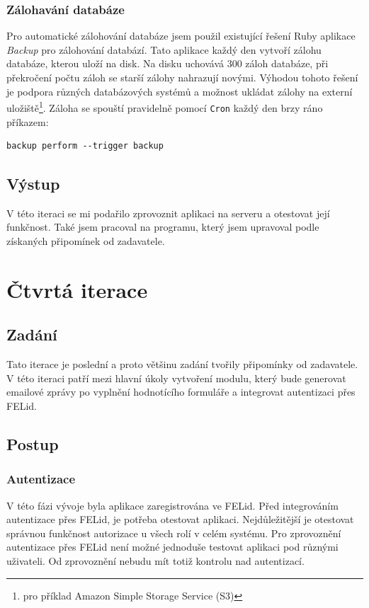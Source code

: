 \subsubsection{Zálohavání databáze}
Pro automatické zálohování databáze jsem použil existující řešení Ruby aplikace \textit{Backup} pro zálohování databází. Tato aplikace každý den vytvoří zálohu databáze, kterou uloží na disk. Na disku uchovává 300 záloh databáze, při překročení počtu záloh se starší zálohy nahrazují novými. Výhodou tohoto řešení je podpora různých databázových systémů a možnost ukládat zálohy na externí uložiště\footnote{pro příklad Amazon Simple Storage Service (S3)}. Záloha se spouští pravidelně pomocí \verb|Cron| každý den brzy ráno příkazem:
\begin{verbatim}
backup perform --trigger backup
\end{verbatim} 

\subsection{Výstup} 
V této iteraci se mi podařilo zprovoznit aplikaci na serveru a otestovat její funkčnost. Také jsem pracoval na programu, který jsem upravoval podle získaných připomínek od zadavatele.

\section{Čtvrtá iterace}
\subsection{Zadání}
Tato iterace je poslední a proto většinu zadání tvořily připomínky od zadavatele. V této iteraci patří mezi hlavní úkoly vytvoření modulu, který bude generovat emailové zprávy po vyplnění hodnotícího formuláře a integrovat autentizaci přes FELid. 
\subsection{Postup}
\subsubsection{Autentizace}
V této fázi vývoje byla aplikace zaregistrována ve FELid. Před integrováním autentizace přes FELid, je potřeba otestovat aplikaci. Nejdůležitější je otestovat správnou funkčnost autorizace u všech rolí v celém systému. Pro zprovoznění autentizace přes FELid není možné jednoduše testovat aplikaci pod různými uživateli. Od zprovoznění nebudu mít totiž kontrolu nad autentizací.

